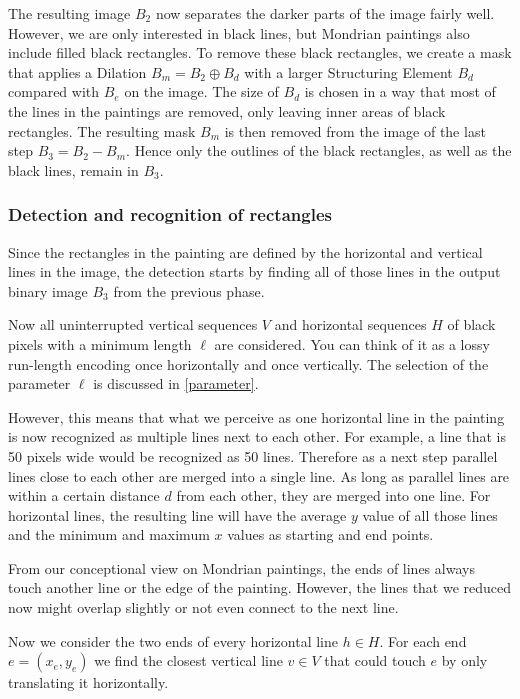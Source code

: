 \documentclass[serif,article,noparskip]{agse-thesis}
\begin{document}
The resulting image $B_2$ now separates the darker parts of the image fairly
well. However, we are only interested in black lines, but Mondrian paintings
also include filled black rectangles. To remove these black rectangles, we
create a mask that applies a Dilation $B_m = B_2 \oplus B_d$ with a larger
Structuring Element $B_d$ compared with $B_e$ on the image. The size of $B_d$ is
chosen in a way that most of the lines in the paintings are removed, only
leaving inner areas of black rectangles. The resulting mask $B_m$ is then
removed from the image of the last step $B_3 = B_2 - B_m$. Hence only the
outlines of the black rectangles, as well as the black lines, remain in $B_3$.

\subsubsection{Detection and recognition of rectangles} \label{rectangles}

Since the rectangles in the painting are defined by the horizontal and
vertical lines in the image, the detection starts by finding all of those lines
in the output binary image $B_3$ from the previous phase.

Now all uninterrupted vertical sequences $V$ and horizontal sequences $H$ of
black pixels with a minimum length $\ell$ are considered. You can think of it as
a lossy run-length encoding once horizontally and once vertically. The selection
of the parameter $\ell$ is discussed in \ref{parameter}.

However, this means that what we perceive as one horizontal line in the painting
is now recognized as multiple lines next to each other. For example, a line that
is 50 pixels wide would be recognized as 50 lines. Therefore as a next step
parallel lines close to each other are merged into a single line. As long as
parallel lines are within a certain distance $d$ from each other, they are merged
into one line. For horizontal lines, the resulting line will have the average
$y$ value of all those lines and the minimum and maximum $x$ values as starting
and end points.

From our conceptional view on Mondrian paintings, the ends of lines always touch
another line or the edge of the painting. However, the lines that we reduced now
might overlap slightly or not even connect to the next line.

Now we consider the two ends of every horizontal line $h \in H$. For each end $e =
(x_e,y_e)$ we find the closest vertical line $v \in V$ that could touch $e$ by only
translating it horizontally.
\end{document}
